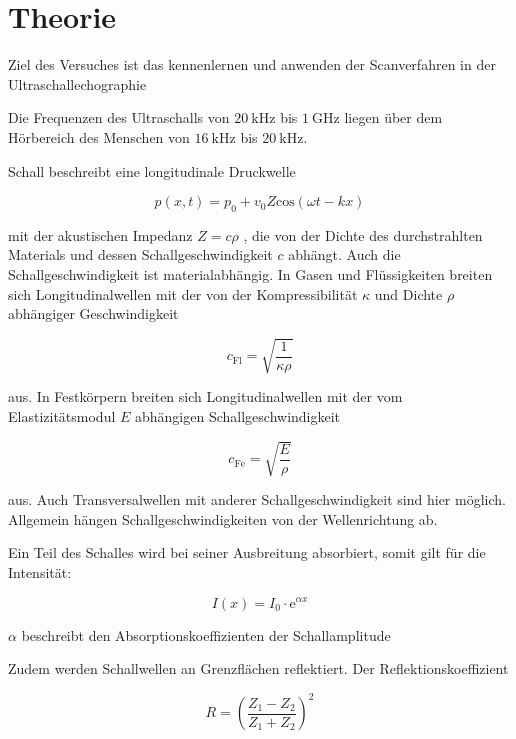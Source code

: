 \section{Theorie}
\label{sec:Theorie}

Ziel des Versuches ist das kennenlernen und anwenden der Scanverfahren
in der Ultraschallechographie

Die Frequenzen des Ultraschalls von $\SI{20}{\kilo\hertz}$ bis
$\SI{1}{\giga\hertz}$ liegen über dem Hörbereich des Menschen
von $\SI{16}{\kilo\hertz}$ bis $\SI{20}{\kilo\hertz}$.

Schall beschreibt eine longitudinale Druckwelle

\begin{equation}
    p(x, t) = p_0 + v_0 Z \text{cos} \left(\omega t - k x \right)
\end{equation}

mit der akustischen Impedanz $Z = c\rho$ , die von der Dichte des
durchstrahlten Materials und dessen Schallgeschwindigkeit $c$ abhängt.
Auch die Schallgeschwindigkeit ist materialabhängig.
In Gasen und Flüssigkeiten breiten sich Longitudinalwellen mit der 
von der Kompressibilität $\kappa$ und Dichte $\rho$ abhängiger
Geschwindigkeit

\begin{equation}
    c_\text{Fl} = \sqrt{\frac{1}{\kappa \rho}}
\end{equation}

aus. In Festkörpern breiten sich Longitudinalwellen
mit der vom Elastizitätsmodul $E$ abhängigen Schallgeschwindigkeit 

\begin{equation}
    c_\text{Fe} = \sqrt{\frac{E}{\rho}}
\end{equation}

aus. Auch Transversalwellen mit anderer Schallgeschwindigkeit sind hier
möglich. Allgemein hängen Schallgeschwindigkeiten von der Wellenrichtung
ab.

Ein Teil des Schalles wird bei seiner Ausbreitung absorbiert, somit
gilt für die Intensität:

\begin{equation}
    I(x) = I_0 \cdot \text{e}^{\alpha x}
\end{equation}

$\alpha$ beschreibt den Absorptionskoeffizienten der Schallamplitude

Zudem werden Schallwellen an Grenzflächen reflektiert. Der Reflektionskoeffizient

\begin{equation}
    R = \left( \frac{Z_1 - Z_2}{Z_1 + Z_2} \right)^2
\end{equation}

